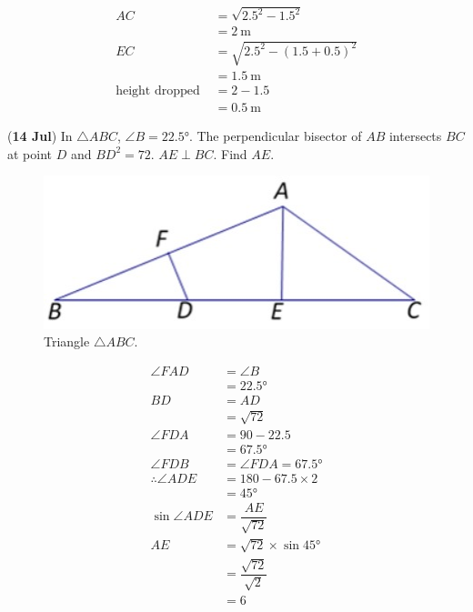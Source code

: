 \documentclass[12pt,answers]{exam}
\renewcommand{\frac}[2]{\dfrac{#1}{#2}}
\newcommand{\qndate}[2]{(\textbf{#1 #2})}
\begin{document}
\begin{questions}
	\begin{solution}
		\begin{align*}
			AC                     & = \sqrt{{2.5}^2 - {1.5}^2}                    \\
			                       & = \qty{2}{\metre}                             \\
			EC                     & = \sqrt{{2.5}^2 - {\left(1.5 + 0.5\right)}^2} \\
			                       & = \qty{1.5}{\metre}                           \\
			\text{height dropped } & = 2 - 1.5                                     \\
			                       & = \qty{0.5}{\metre}
		\end{align*}
	\end{solution}

	\question \qndate{14}{Jul} In $\triangle ABC$, $\angle B = \ang{22.5}$. The
	perpendicular bisector of $AB$ intersects $BC$ at point $D$ and ${BD}^2 = 72$.
	$AE \perp BC$. Find $AE$.
	\begin{figure}[htpb]
		\centering
		\includegraphics[scale=0.5]{./images/0714_Tri.jpeg}
		\caption{Triangle $\triangle ABC$.}
		\label{fig:0714_Tri}
	\end{figure}

	\begin{solution}
		\begin{align*}
			\angle FAD            & = \angle B                       \\
			                      & = \ang{22.5}                     \\
			BD                    & = AD                             \\
			                      & = \sqrt{72}                      \\
			\angle FDA            & = 90 - 22.5                      \\
			                      & = \ang{67.5}                     \\
			\angle FDB            & = \angle FDA = \ang{67.5}        \\
			\therefore \angle ADE & = 180 - 67.5 \times 2            \\
			                      & = \ang{45}                       \\
			\sin \angle ADE       & = \frac{AE}{\sqrt{72}}           \\
			AE                    & = \sqrt{72} \times \sin \ang{45} \\
			                      & = \frac{\sqrt{72}}{\sqrt{2}}     \\
			                      & = 6
		\end{align*}
	\end{solution}


\end{questions}
\end{document}
